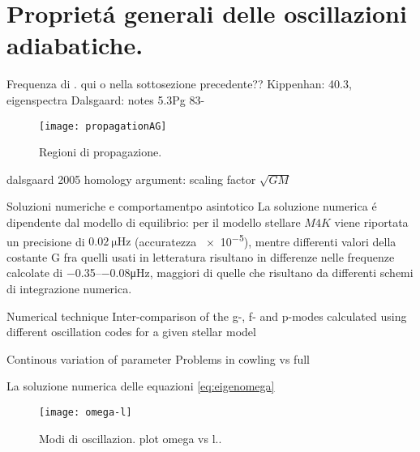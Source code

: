 \documentclass[../main.tex]{subfiles}
\begin{document}
\section{Propriet\'a generali delle oscillazioni adiabatiche.}

\begin{todo}{Frequenza di \bv{}.}
qui o nella sottosezione precedente??
Kippenhan: 40.3, eigenspectra
Dalsgaard: notes 5.3Pg 83-
\end{todo}

\begin{figure}[!ht]
\centering
\texttt{[image: propagationAG]}
\caption{Regioni di propagazione.}
\end{figure}


\begin{todo}{dalsgaard 2005}
homology argument: scaling factor $\sqrt{GM}$
\end{todo}


\begin{todo}{Soluzioni numeriche e comportamentpo asintotico}
La soluzione numerica \'e dipendente dal modello di equilibrio: per il modello stellare $M4K$ viene riportata un precisione di $\SI{0.02}{\micro\hertz}$ (accuratezza \num{e-5}), mentre differenti valori della costante G fra quelli usati in letteratura risultano in differenze nelle frequenze calcolate di \numrange{-0.35}{-0.08}\si{\micro\hertz}, maggiori di quelle che risultano da differenti schemi di integrazione numerica.
\end{todo}

\begin{todo}{Numerical technique}
Inter-comparison of the g-, f- and p-modes calculated using different oscillation codes for a given stellar model

\end{todo}

\begin{todo}{Continous variation of parameter}
Problems in cowling vs full
\end{todo}

La soluzione numerica delle equazioni \eqref{eq:eigenomega}



\begin{figure}[!ht]
\centering
\texttt{[image: omega-l]}
\caption{Modi di oscillazion. plot omega vs l..}
\end{figure}
\end{document}
